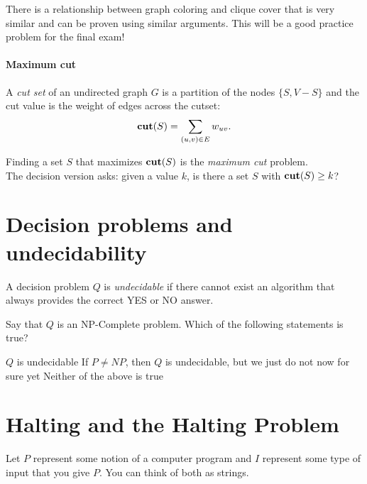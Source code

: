\documentclass[11  pt]{article}
\begin{document}
\vfill
There is a relationship between graph coloring and clique cover that is very similar and can be proven using similar arguments. This will be a good practice problem for the final exam!

\newpage
\paragraph{Maximum cut}
A \emph{cut set} of an undirected graph $G$ is a partition of the nodes $\{S, V-S\}$ and the cut value is the weight of edges across the cutset:
\begin{equation}
	\textbf{cut}(S) = \sum_{(u,v) \in E} w_{uv}.
\end{equation}

Finding a set $S$ that maximizes $\textbf{cut}(S)$ is the \emph{maximum cut} problem.\\

The decision version asks: given a value $k$, is there a set $S$ with $\textbf{cut}(S) \geq k$? \\


\newpage

	\section{Decision problems and undecidability}
	A decision problem $Q$ is \emph{undecidable} if there cannot exist an algorithm that always provides the correct YES or NO answer.
	
	\begin{Qu}
		Say that $Q$ is an NP-Complete problem. Which of the following statements is true?
		\begin{itemize}
			\aitem $Q$ is undecidable 
			\bitem If $P \neq NP$, then $Q$ is undecidable, but we just do not now for sure yet
			\citem Neither of the above is true
		\end{itemize}
	\end{Qu}
	




\newpage

\section{Halting and the Halting Problem}
Let $P$ represent some notion of a computer program and $I$ represent some type of input that you give $P$. You can think of both as strings.\\
\end{document}
